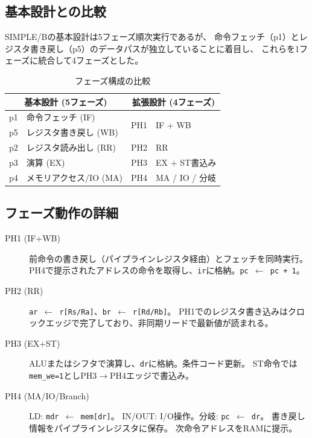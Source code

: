 \documentclass[a4paper,11pt]{ltjsarticle}
\begin{document}
\subsection{基本設計との比較}

SIMPLE/Bの基本設計は5フェーズ順次実行であるが、
命令フェッチ（p1）とレジスタ書き戻し（p5）のデータパスが独立していることに着目し、
これらを1フェーズに統合して4フェーズとした。

\begin{table}[h]
\centering
\caption{フェーズ構成の比較}
\begin{tabular}{ll|ll}
\toprule
\multicolumn{2}{c|}{基本設計 (5フェーズ)} & \multicolumn{2}{c}{拡張設計 (4フェーズ)} \\
\midrule
p1 & 命令フェッチ (IF)       & \multirow{2}{*}{PH1} & \multirow{2}{*}{IF + WB} \\
p5 & レジスタ書き戻し (WB)   & & \\
p2 & レジスタ読み出し (RR)   & PH2 & RR \\
p3 & 演算 (EX)               & PH3 & EX + ST書込み \\
p4 & メモリアクセス/IO (MA)  & PH4 & MA / IO / 分岐 \\
\bottomrule
\end{tabular}
\end{table}

\subsection{フェーズ動作の詳細}

\begin{description}
\item[PH1 (IF+WB)]
前命令の書き戻し（パイプラインレジスタ経由）とフェッチを同時実行。
PH4で提示されたアドレスの命令を取得し、\texttt{ir}に格納。\texttt{pc $\leftarrow$ pc + 1}。

\item[PH2 (RR)]
\texttt{ar $\leftarrow$ r[Rs/Ra]}、\texttt{br $\leftarrow$ r[Rd/Rb]}。
PH1でのレジスタ書き込みはクロックエッジで完了しており、非同期リードで最新値が読まれる。

\item[PH3 (EX+ST)]
ALUまたはシフタで演算し、\texttt{dr}に格納。条件コード更新。
ST命令では\texttt{mem\_we=1}としPH3$\to$PH4エッジで書込み。

\item[PH4 (MA/IO/Branch)]
LD: \texttt{mdr $\leftarrow$ mem[dr]}。
IN/OUT: I/O操作。分岐: \texttt{pc $\leftarrow$ dr}。
書き戻し情報をパイプラインレジスタに保存。
次命令アドレスをRAMに提示。
\end{description}
\end{document}
